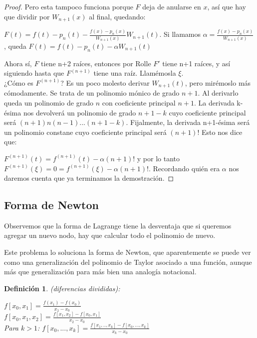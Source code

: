 \documentclass[10pt,a4paper,final]{report}
\newtheorem{definition}{Definición}
\begin{document}
{\begin{proof}
Pero esta tampoco funciona porque $F$ deja de anularse en $x$, así que hay que dividir por $W_{n+1}(x)$ al final, quedando:

$F(t) = f(t) - p_n(t) - \frac{f(x)-p_n(x)}{W_{n+1}(x)} W_{n+1}(t)$. Si llamamos $\alpha = \frac{f(x)-p_n(x)}{W_{n+1}(x)}$, queda $F(t) = f(t) - p_n(t) - \alpha W_{n+1}(t)$

Ahora sí, $F$ tiene n+2 raíces, entonces por Rolle $F'$ tiene n+1 raíces, y así siguiendo hasta que $F^{(n+1)}$ tiene una raíz. Llamémosla $\xi$.\\

¿Cómo es $F^{(n+1)}$? Es un poco molesto derivar $W_{n+1}(t)$, pero mirémoslo más cómodamente. Se trata de un polinomio mónico de grado $n+1$. Al derivarlo queda un polinomio de grado $n$ con coeficiente principal $n+1$. La derivada k-ésima nos devolverá un polinomio de grado $n+1-k$ cuyo coeficiente principal será $(n+1)n(n-1)...(n+1-k)$. Fijalmente, la derivada n+1-ésima será un polinomio constane cuyo coeficiente principal será $(n+1)!$ Esto nos dice que:

$F^{(n+1)}(t) = f^{(n+1)}(t)- \alpha (n+1)!$ y por lo tanto $F^{(n+1)}(\xi)= 0 = f^{(n+1)}(\xi) - \alpha (n+1)!$. Recordando quién era $\alpha$ nos daremos cuenta que ya terminamos la demostración.

\end{proof}

\subsection{Forma de Newton}

Observemos que la forma de Lagrange tiene la desventaja que si queremos agregar un nuevo nodo, hay que calcular todo el polinomio de nuevo.

Este problema lo soluciona la forma de Newton, que aparentemente se puede ver como una generalización del polinomio de Taylor asociado a una función, aunque más que generalización para más bien una analogía notacional.


\begin{definition}(diferencias divididas):

$f[x_0,x_1]=\frac{f(x_1)-f(x_0)}{x_1-x_0}$\\

$f[x_0,x_1,x_2]=\frac{f[x_1,x_2]-f[x_0,x_1]}{x_2-x_0}$\\
Para $k>1$: $f[x_0,...,x_{k}]=\frac{f[x_1,..,x_{k}]-f[x_0,...,x_k]}{x_{k}-x_0}$
\end{definition}

}
\end{document}
